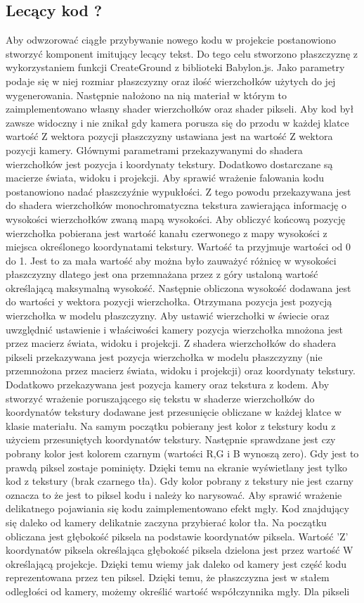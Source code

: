 \documentclass[12pt,a4paper,polish,thesis]{dcsbook}
\begin{document}
{	\subsection{Lecący kod ?}

	Aby odwzorować ciągłe przybywanie nowego kodu w projekcie postanowiono stworzyć komponent imitujący lecący tekst. Do tego celu stworzono płaszczyznę z wykorzystaniem funkcji CreateGround z biblioteki Babylon.js. Jako parametry podaje się w niej rozmiar płaszczyzny oraz ilość wierzchołków użytych do jej wygenerowania. Następnie nałożono na nią materiał w którym to zaimplementowano własny shader wierzchołków oraz shader pikseli. Aby kod był zawsze widoczny i nie znikał gdy kamera porusza się do przodu w każdej klatce wartość Z wektora pozycji płaszczyzny ustawiana jest na wartość Z wektora pozycji kamery. Głównymi parametrami przekazywanymi do shadera wierzchołków jest pozycja i koordynaty tekstury. Dodatkowo dostarczane są macierze świata, widoku i projekcji. Aby sprawić wrażenie falowania kodu postanowiono nadać płaszczyźnie wypukłości. Z tego powodu przekazywana jest do shadera wierzchołków monochromatyczna tekstura zawierająca informację o wysokości wierzchołków zwaną mapą wysokości. Aby obliczyć końcową pozycję wierzchołka pobierana jest wartość kanału czerwonego z mapy wysokości z miejsca określonego koordynatami tekstury. Wartość ta przyjmuje wartości od 0 do 1. Jest to za mała wartość aby można było zauważyć różnicę w wysokości płaszczyzny dlatego jest ona przemnażana przez z góry ustaloną wartość określającą maksymalną wysokość. Następnie obliczona wysokość dodawana jest do wartości y wektora pozycji wierzchołka. Otrzymana pozycja jest pozycją wierzchołka w modelu płaszczyzny. Aby ustawić wierzchołki w świecie oraz uwzględnić ustawienie i właściwości kamery pozycja wierzchołka mnożona jest przez macierz świata, widoku i projekcji. Z shadera wierzchołków do shadera pikseli przekazywana jest pozycja wierzchołka w modelu płaszczyzny (nie przemnożona przez macierz świata, widoku i projekcji) oraz koordynaty tekstury. Dodatkowo przekazywana jest pozycja kamery oraz tekstura z kodem. Aby stworzyć wrażenie poruszającego się tekstu w shaderze wierzchołków do koordynatów tekstury dodawane jest przesunięcie obliczane w każdej klatce w klasie materiału. Na samym początku pobierany jest kolor z tekstury kodu z użyciem przesuniętych koordynatów tekstury. Następnie sprawdzane jest czy pobrany kolor jest kolorem czarnym (wartości R,G i B wynoszą zero). Gdy jest to prawdą piksel zostaje pominięty. Dzięki temu na ekranie wyświetlany jest tylko kod z tekstury (brak czarnego tła). Gdy kolor pobrany z tekstury nie jest czarny oznacza to że jest to piksel kodu i należy ko narysować. Aby sprawić wrażenie delikatnego pojawiania się kodu zaimplementowano efekt mgły. Kod znajdujący się daleko od kamery delikatnie zaczyna przybierać kolor tła. Na początku obliczana jest głębokość piksela na podstawie koordynatów piksela. Wartość 'Z' koordynatów piksela określająca głębokość piksela dzielona jest przez wartość W określającą projekcje. Dzięki temu wiemy jak daleko od kamery jest część kodu reprezentowana przez ten piksel. Dzięki temu, że płaszczyzna jest w stałem odległości od kamery, możemy określić wartość współczynnika mgły. Dla pikseli }
\end{document}
